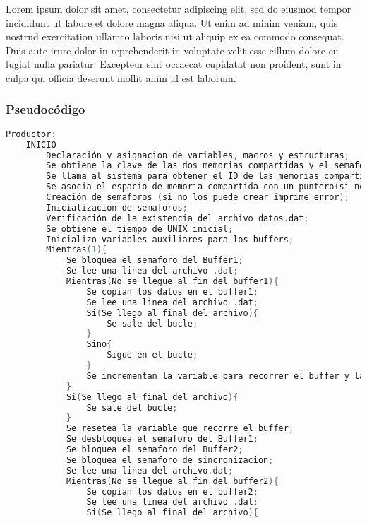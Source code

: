 Lorem ipsum dolor sit amet, consectetur adipiscing elit, sed do eiusmod tempor incididunt ut labore et dolore magna aliqua. Ut enim ad minim veniam, quis nostrud exercitation ullamco laboris nisi ut aliquip ex ea commodo consequat. Duis aute irure dolor in reprehenderit in voluptate velit esse cillum dolore eu fugiat nulla pariatur. Excepteur sint occaecat cupidatat non proident, sunt in culpa qui officia deserunt mollit anim id est laborum.\\

\subsubsection{Pseudocódigo}

\begin{lstlisting}[language=C]          % No usar tildes en el pseudocódigo
    Productor:
    INICIO
        Declaración y asignacion de variables, macros y estructuras;
        Se obtiene la clave de las dos memorias compartidas y el semaforo (en el caso de que no las obtenga imprime error);
        Se llama al sistema para obtener el ID de las memorias compartidas (en el caso de que no las obtenga imprime error);
        Se asocia el espacio de memoria compartida con un puntero(si no puede asociar imprime error);
        Creación de semaforos (si no los puede crear imprime error);
        Inicializacion de semaforos;
        Verificación de la existencia del archivo datos.dat;
        Se obtiene el tiempo de UNIX inicial;
        Inicializo variables auxiliares para los buffers;
        Mientras(1){
	        Se bloquea el semaforo del Buffer1;
	        Se lee una linea del archivo .dat;
	        Mientras(No se llegue al fin del buffer1){
		        Se copian los datos en el buffer1;
		        Se lee una linea del archivo .dat;
		        Si(Se llego al final del archivo){
			        Se sale del bucle;
                }
                Sino{
    	            Sigue en el bucle;
                }
                Se incrementan la variable para recorrer el buffer y la del id;
	        }
	        Si(Se llego al final del archivo){
	            Se sale del bucle;
            }
            Se resetea la variable que recorre el buffer;
            Se desbloquea el semaforo del Buffer1;
            Se bloquea el semaforo del Buffer2;
            Se bloquea el semaforo de sincronizacion;
            Se lee una linea del archivo.dat;
            Mientras(No se llegue al fin del buffer2){
		        Se copian los datos en el buffer2;
		        Se lee una linea del archivo .dat;
		        Si(Se llego al final del archivo){

\end{lstlisting}
